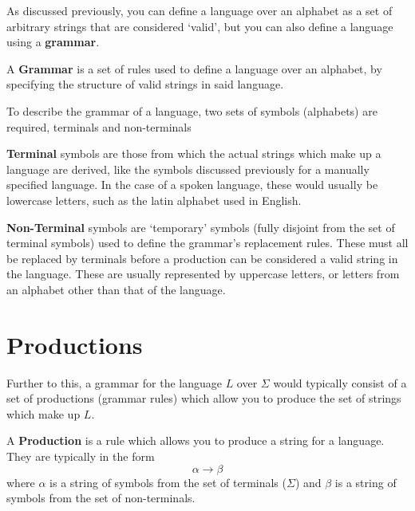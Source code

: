 
As discussed previously, you can define a language over an alphabet as a set of arbitrary strings that are considered
 `valid', but you can also define a language using a \textbf{grammar}.

\begin{definition*}{}{}
  A \textbf{Grammar} is a set of rules used to define a language over an alphabet, by specifying the structure of valid
   strings in said language.
\end{definition*}

To describe the grammar of a language, two sets of symbols (alphabets) are required, terminals and non-terminals

\begin{definition*}{}{}
  \textbf{Terminal} symbols are those from which the actual strings which make up a language are derived, like the
   symbols discussed previously for a manually specified language. In the case of a spoken language, these would usually
   be lowercase letters, such as the latin alphabet used in English.
\end{definition*}

\begin{definition*}{}{}
  \textbf{Non-Terminal} symbols are `temporary' symbols (fully disjoint from the set of terminal symbols) used to define
   the grammar's replacement rules. These must all be replaced by terminals before a production can be considered a
   valid string in the language. These are usually represented by uppercase letters, or letters from an alphabet other
   than that of the language.
\end{definition*}

\section*{Productions}

Further to this, a grammar for the language $L$ over $\Sigma$ would typically consist of a set of productions (grammar
 rules) which allow you to produce the set of strings which make up $L$.

\begin{definition*}{}{}
  A \textbf{Production} is a rule which allows you to produce a string for a language. They are typically in the form
  \begin{equation*}
    \alpha \rightarrow \beta
  \end{equation*}
  where $\alpha$ is a string of symbols from the set of terminals ($\Sigma$) and $\beta$ is a string of symbols from the
   set of non-terminals.
\end{definition*}

